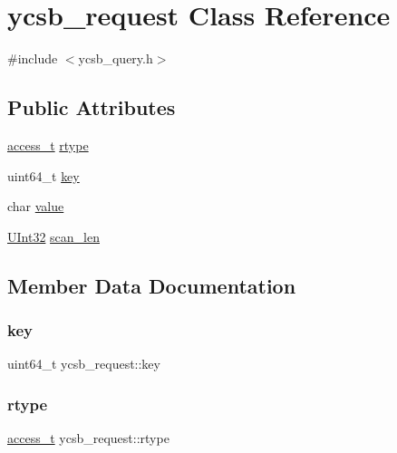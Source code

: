 \hypertarget{classycsb__request}{}\section{ycsb\+\_\+request Class Reference}
\label{classycsb__request}


{\ttfamily \#include $<$ycsb\+\_\+query.\+h$>$}

\subsection*{Public Attributes}
\begin{DoxyCompactItemize}
\item 
\hyperlink{global_8h_a567f81b0ae33b00d189d7714e9fde0bc}{access\+\_\+t} \hyperlink{classycsb__request_af0df8d7491496ae7145729dd0be4355f}{rtype}
\item 
uint64\+\_\+t \hyperlink{classycsb__request_a3709e2fa8cadb02b580998fb5cd6f62d}{key}
\item 
char \hyperlink{classycsb__request_a57822b9157083b797236b474f795ca36}{value}
\item 
\hyperlink{global_8h_a7e8aeec7b6541935dfc6f608cd5170ce}{U\+Int32} \hyperlink{classycsb__request_a6f0822555a46b0125a321043c871f619}{scan\+\_\+len}
\end{DoxyCompactItemize}


\subsection{Member Data Documentation}
\mbox{\label{classycsb__request_a3709e2fa8cadb02b580998fb5cd6f62d}} 
\subsubsection{\texorpdfstring{key}{key}}
{\footnotesize\ttfamily uint64\+\_\+t ycsb\+\_\+request\+::key}

\mbox{\label{classycsb__request_af0df8d7491496ae7145729dd0be4355f}} 
\subsubsection{\texorpdfstring{rtype}{rtype}}
{\footnotesize\ttfamily \hyperlink{global_8h_a567f81b0ae33b00d189d7714e9fde0bc}{access\+\_\+t} ycsb\+\_\+request\+::rtype}

